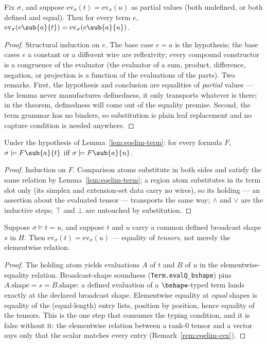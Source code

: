 \begin{blemma}\label{lem:eqelim-term}
Fix $\sigma$, and suppose $\mathrm{ev}_\sigma(t) = \mathrm{ev}_\sigma(u)$
as partial values (both undefined, or both defined and equal). Then for
every term $e$,
$\mathrm{ev}_\sigma(e\sub{a}{t}) = \mathrm{ev}_\sigma(e\sub{a}{u})$.
\end{blemma}
\begin{proof}
Structural induction on $e$. The base case $e = a$ is the hypothesis; the
base cases $e$ a constant or a different wire are reflexivity; every
compound constructor is a congruence of the evaluator (the evaluator of a
sum, product, difference, negation, or projection is a function of the
evaluations of the parts). Two remarks. First, the hypothesis and
conclusion are equalities of \emph{partial} values --- the lemma never
manufactures definedness, it only transports whatever is there; in the
theorem, definedness will come out of the equality premise. Second, the
term grammar has no binders, so substitution is plain leaf replacement
and no capture condition is needed anywhere.
\end{proof}

\begin{blemma}\label{lem:eqelim-form}
Under the hypothesis of Lemma~\ref{lem:eqelim-term}: for every formula
$F$,\ $\sigma \models F\sub{a}{t}$ iff $\sigma \models F\sub{a}{u}$.
\end{blemma}
\begin{proof}
Induction on $F$. Comparison atoms substitute in both sides and satisfy
the same relation by Lemma~\ref{lem:eqelim-term}; a region atom
substitutes in its term slot only (its simplex and extension-set data
carry no wires), so its holding --- an assertion about the evaluated
tensor --- transports the same way; $\wedge$ and $\vee$ are the inductive
steps; $\top$ and $\bot$ are untouched by substitution.
\end{proof}

\begin{blemma}\label{lem:eqelim-pin}
Suppose $\sigma \models t = u$, and suppose $t$ and $u$ carry a common
defined broadcast shape $s$ in $H$. Then
$\mathrm{ev}_\sigma(t) = \mathrm{ev}_\sigma(u)$ --- equality of
\emph{tensors}, not merely the elementwise relation.
\end{blemma}
\begin{proof}
The holding atom yields evaluations $A$ of $t$ and $B$ of $u$ in the
elementwise-equality relation. Broadcast-shape soundness
(\texttt{Term.evalQ\_bshape}) pins $A.\mathrm{shape} = s =
B.\mathrm{shape}$: a defined evaluation of a $\bshape$-typed term lands
exactly at the declared broadcast shape. Elementwise equality at
\emph{equal} shapes is equality of the (equal-length) entry lists,
position by position, hence equality of the tensors. This is the one step
that consumes the typing condition, and it is false without it: the
elementwise relation between a rank-0 tensor and a vector says only that
the scalar matches every entry (Remark~\ref{rem:eqelim-cex}).
\end{proof}

